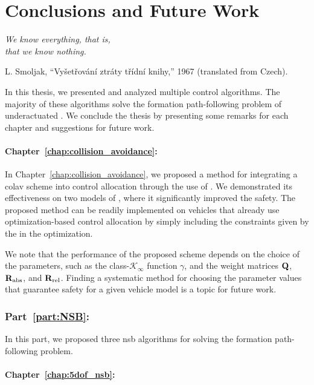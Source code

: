 \chapter{Conclusions and Future Work}
\label{part:conclusions}

\setlength{\epigraphwidth}{0.46\textwidth}
\epigraph{ \it
    We know everything, that is, \\
    that we know nothing.
}{
    L. Smoljak, ``Vyšetřování ztráty třídní knihy,'' 1967 (translated from Czech).
}

In this thesis, we presented and analyzed multiple control algorithms.
The majority of these algorithms solve the formation path-following problem of underactuated .
We conclude the thesis by presenting some remarks for each chapter and suggestions for future work.

\subsubsection{Chapter~\ref{chap:collision_avoidance}: }
In Chapter~\ref{chap:collision_avoidance}, we proposed a method for integrating a \acrfull{colav} scheme into control allocation through the use of .
We demonstrated its effectiveness on two models of , where it significantly improved the safety.
The proposed method can be readily implemented on vehicles that already use optimization-based control allocation by simply including the constraints given by the  in the optimization.

We note that the performance of the proposed scheme depends on the choice of the parameters, such as the class-$\mathcal{K}_{\infty}$ function $\gamma$, and the weight matrices $\mathbf{Q}$, $\mathbf{R}_{\rm abs}$, and $\mathbf{R}_{\rm rel}$.
Finding a systematic method for choosing the parameter values that guarantee safety for a given vehicle model is a topic for future work.

\subsection*{Part~\ref{part:NSB}: }

In this part, we proposed three \gls{nsb} algorithms for solving the formation path-following problem.

\subsubsection{Chapter~\ref{chap:5dof_nsb}: }

